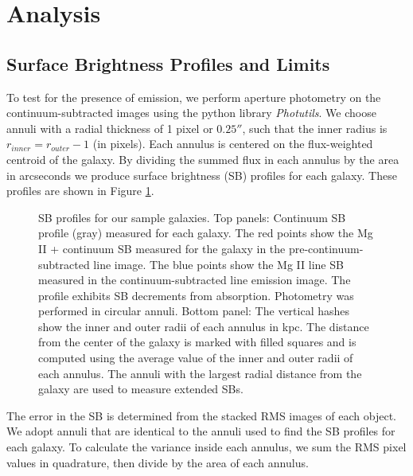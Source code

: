 \documentclass[twocolumn]{aastex62}
\begin{document}
\section{Analysis} \label{sec:analysis}

\subsection{Surface Brightness Profiles and Limits}\label{sec.sb}
To test for the presence of  emission, we perform aperture photometry on the continuum-subtracted images using the python library \emph{Photutils}. We choose annuli with a radial thickness of 1 pixel or $0.25 ''$, such that the inner radius is $r_{inner}=r_{outer}-1$ (in pixels). Each annulus is centered on the flux-weighted centroid of the galaxy. By dividing the summed flux in each annulus by the area in arcseconds we produce surface brightness (SB) profiles for each galaxy. These profiles are shown in Figure \ref{fig:sb_profiles}. 

\begin{figure}
\centering
{}
\caption{SB profiles for our sample galaxies. Top panels: Continuum SB profile (gray) measured for each galaxy. The red points show the Mg II + continuum SB measured for the galaxy in the pre-continuum-subtracted line image. The blue points show the Mg II line SB measured  in the continuum-subtracted line emission image.  The profile exhibits SB decrements from  absorption. Photometry was performed in circular annuli. Bottom panel: The vertical hashes show the inner and outer radii of each annulus in kpc. The distance from the center of the galaxy is marked with filled squares and is computed using the average value of the inner and outer radii of each annulus. The annuli with the largest radial distance from the galaxy are used to measure extended SBs.}
\label{fig:sb_profiles}
\end{figure}

The error in the SB is determined from the stacked RMS images of each object.  We adopt annuli that are identical to the annuli used to find the SB profiles for each galaxy. To calculate the variance inside each annulus, we sum the RMS pixel values in quadrature, then divide by the area of each annulus. 
\end{document}
